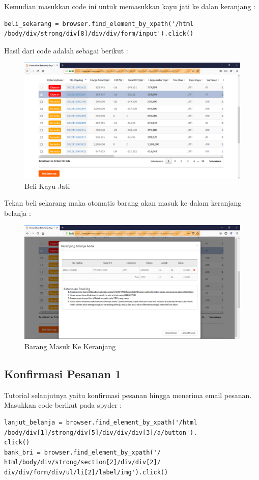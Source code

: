 Kemudian masukkan code ini untuk memasukkan kayu jati ke dalan keranjang :
\begin{verbatim}
beli_sekarang = browser.find_element_by_xpath('/html
/body/div/strong/div[8]/div/div/form/input').click()
\end{verbatim}
Hasil dari code adalah sebagai berikut :
\begin{figure}[h]
	\centering
	\includegraphics[scale=0.25]{figures/belii}
	\caption{Beli Kayu Jati}
\end{figure}

\newpage
Tekan beli sekarang maka otomatis barang akan masuk ke dalam keranjang belanja :
\begin{figure}[h]
	\centering
	\includegraphics[scale=0.25]{figures/keranjangg}
	\caption{Barang Masuk Ke Keranjang}
\end{figure}

\subsection{Konfirmasi Pesanan 1}
Tutorial selanjutnya yaitu konfirmasi pesanan hingga menerima email pesanan. 
Masukkan code berikut pada spyder :
\begin{verbatim}
lanjut_belanja = browser.find_element_by_xpath('/html
/body/div[1]/strong/div[5]/div/div/div[3]/a/button').
click()
bank_bri = browser.find_element_by_xpath('/
html/body/div/strong/section[2]/div/div[2]/
div/div/form/div/ul/li[2]/label/img').click()
\end{verbatim}

